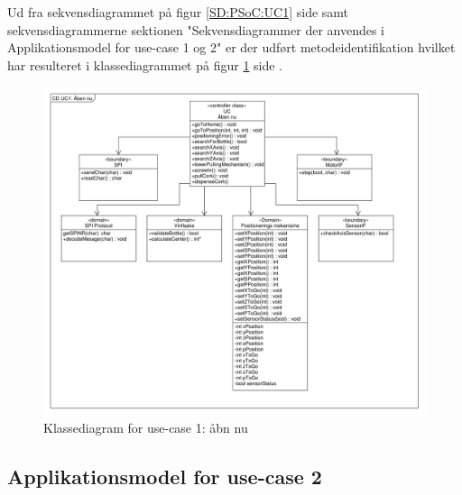 Ud fra sekvensdiagrammet på figur \ref{SD:PSoC:UC1} side \pageref{SD:PSoC:UC1} samt sekvensdiagrammerne sektionen "Sekvensdiagrammer der anvendes i Applikationsmodel for use-case 1 og 2" er der udført metodeidentifikation hvilket har resulteret i klassediagrammet på figur \ref{CD:PSoC:UC1} side \pageref{CD:PSoC:UC1}.

\begin{figure}[H]
	\caption{Klassediagram for use-case 1: åbn nu}
	\label{CD:PSoC:UC1}
	\includegraphics[scale=0.35,trim=0 0 0 0, clip]{APPSoC/UC1-CD-Aaben-nu-PSoC}
\end{figure}

\subsection{Applikationsmodel for use-case 2}



